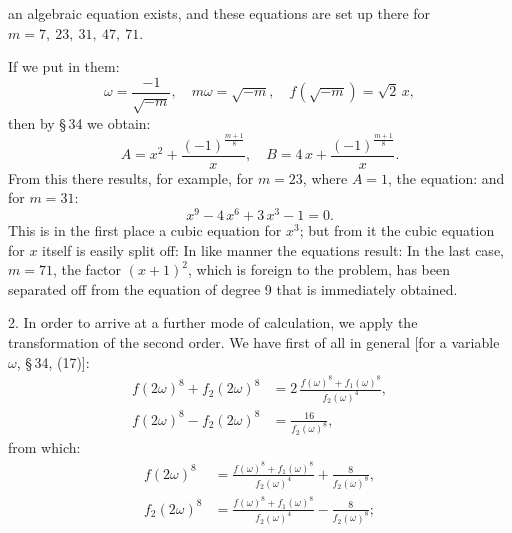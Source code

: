 an algebraic equation exists, and these equations are set up there
for $m=7,\ 23,\ 31,\ 47,\ 71$.

If we put in them:
\[
\omega=\frac{-1}{\sqrt{-m}},\quad m\omega=\sqrt{-m},\quad f(\sqrt{-m})=\sqrt2\,x,
\]
then by \S\,34 we obtain:
\[
A=x^2+\frac{(-1)^{\frac{m+1}{8}}}{x},\quad B=4\,x+\frac{(-1)^{\frac{m+1}{8}}}{x}.
\]
From this there results, for example, for $m=23$, where $A=1$, the equation:
and for $m=31$:
\[
x^9-4\,x^6+3\,x^3-1=0.
\]
This is in the first place a cubic equation for $x^3$; but from it the
cubic equation for $x$ itself is easily split off:
In like manner the equations result:
In the last case, $m=71$, the factor $(x+1)^2$, which is foreign to the
problem, has been separated off from the equation of degree 9 that is
immediately obtained.

2. In order to arrive at a further mode of calculation, we apply the
transformation of the second order. We have first of all in general
[for a variable $\omega$, \S\,34, (17)]:
\[
\begin{aligned}
f(2\omega)^8+f_2(2\omega)^8&=2\,\frac{f(\omega)^8+f_1(\omega)^8}{f_2(\omega)^4},\\
f(2\omega)^8-f_2(2\omega)^8&=\frac{16}{f_2(\omega)^8},
\end{aligned}
\]
from which:
\[
\begin{aligned}
f(2\omega)^8&=\frac{f(\omega)^8+f_1(\omega)^8}{f_2(\omega)^4}+\frac{8}{f_2(\omega)^8},\\
f_2(2\omega)^8&=\frac{f(\omega)^8+f_1(\omega)^8}{f_2(\omega)^4}-\frac{8}{f_2(\omega)^8};
\end{aligned}
\]
